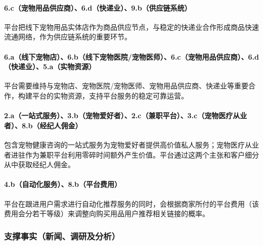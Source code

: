 \documentclass[a4paper]{ctexart}
\begin{document}
\paragraph{6.c（宠物用品供应商）、6.d（快递业）、9.b（供应链系统）}平台把线下宠物用品实体店作为商品供应节点，与稳定的快递业合作形成商品快速流通网络，作为供应链系统的重要环节。
\paragraph{6.a（线下宠物店）、6.b（线下宠物医院/宠物医师）、6.c（宠物用品供应商）、6.d（快递业）、5.a（实物资源）}平台需要维持与宠物店、宠物医院/宠物医师、宠物用品供应商、快递业等重要合作，构建平台的实物资源，支持平台服务的稳定可靠运营。
\paragraph{2.a（一站式服务）、3.b（宠物爱好者）、2.c（兼职平台）、3.c（宠物医疗从业者）、8.b（经纪人佣金）}包含宠物健康咨询的一站式服务为宠物爱好者提供高价值私人服务；宠物医疗从业者进驻作为兼职平台利用零碎时间额外产生价值。平台通过这两个主张和客户细分从中获取经纪人佣金。
\paragraph{4.b（自动化服务）、8.b（平台费用）}平台在跟进用户需求进行自动化推荐服务的同时，会根据商家所付的平台费用（该费用会分若干等级）来调整向购买用品用户推荐相关链接的概率。
\subsubsection{支撑事实（新闻、调研及分析）}
\end{document}
